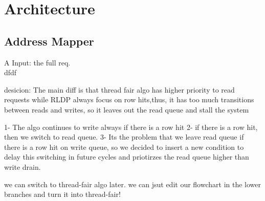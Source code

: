 \chapter{Architecture}


\section{Address Mapper}
\hspace{10mm}A Input:  the full req.\\ dfdf




desicion:
The main diff is that thread fair algo has higher priority to read requests while RLDP always 
focus on row hits,thus, it has too much transitions between reads and writes, so it leaves out 
the read queue and stall the system 


1- The algo continues to write always if there is a row hit
2- if there is a row hit, then we switch to read queue.
3- Its the problem that we leave read queue if there is a row hit on write queue, so we
decided to insert a new condition to delay this switching in future cycles and priotirzes the read queue higher than write drain.


we can switch to thread-fair algo later. we can jsut edit our flowchart in the lower branches 
and turn it into thread-fair!
















































